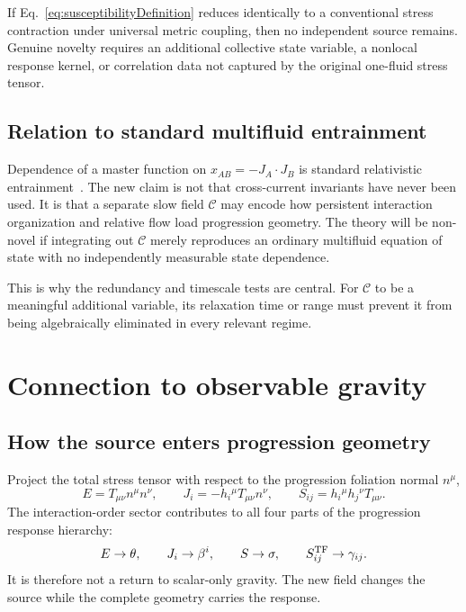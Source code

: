 \documentclass[11pt]{article}
\begin{document}
If Eq.~\eqref{eq:susceptibilityDefinition} reduces identically to a conventional stress contraction under universal metric coupling, then no independent source remains.  Genuine novelty requires an additional collective state variable, a nonlocal response kernel, or correlation data not captured by the original one-fluid stress tensor.

\subsection{Relation to standard multifluid entrainment}

Dependence of a master function on $x_{AB}=-J_A\cdot J_B$ is standard relativistic entrainment~\cite{AnderssonComer2021,Gavassino2019}.  The new claim is not that cross-current invariants have never been used.  It is that a separate slow field $\mathcal C$ may encode how persistent interaction organization and relative flow load progression geometry.  The theory will be non-novel if integrating out $\mathcal C$ merely reproduces an ordinary multifluid equation of state with no independently measurable state dependence.

This is why the redundancy and timescale tests are central.  For $\mathcal C$ to be a meaningful additional variable, its relaxation time or range must prevent it from being algebraically eliminated in every relevant regime.

\section{Connection to observable gravity}

\subsection{How the source enters progression geometry}

Project the total stress tensor with respect to the progression foliation normal $n^\mu$,
\begin{equation}
E=T_{\mu\nu}n^\mu n^\nu,
\qquad
J_i=-h_i{}^\mu T_{\mu\nu}n^\nu,
\qquad
S_{ij}=h_i{}^\mu h_j{}^\nu T_{\mu\nu}.
\label{eq:ADMprojections}
\end{equation}
The interaction-order sector contributes to all four parts of the progression response hierarchy:
\begin{equation}
E\rightarrow\theta,
\qquad
J_i\rightarrow\beta^i,
\qquad
S\rightarrow\sigma,
\qquad
S_{ij}^{\rm TF}\rightarrow\gamma_{ij}.
\label{eq:responseHierarchy}
\end{equation}
It is therefore not a return to scalar-only gravity.  The new field changes the source while the complete geometry carries the response.
\end{document}
